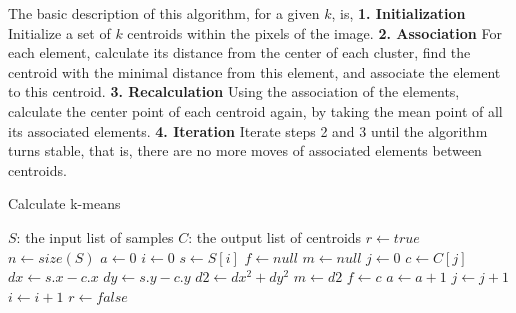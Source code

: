 \documentclass[12pt]{article}
\begin{document}
The basic description of this algorithm, for a given $k$, is, \newline
\textbf{1. Initialization} Initialize a set of $k$ centroids within the pixels of the image. \newline
\textbf{2. Association} For each element, calculate its distance from the center of each cluster, find the centroid with the minimal distance from this element, and associate the element to this centroid. \newline
\textbf{3. Recalculation} Using the association of the elements, calculate the center point of each centroid again, by taking the mean point of all its associated elements. \newline
\textbf{4. Iteration} Iterate steps 2 and 3 until the algorithm turns stable, that is, there are no more moves of associated elements between centroids. \newline

\begin{algorithm}
\caption{Calculate k-means}
\begin{algorithmic} 
\REQUIRE $S$: the input list of samples
\ENSURE $C$: the output list of centroids
\STATE $r \leftarrow true$
\STATE $n \leftarrow size(S)$
\newline
{}
\STATE $a \leftarrow 0$
\newline
\STATE $i \leftarrow 0$
\STATE $s \leftarrow S[i]$
\newline
\STATE $f \leftarrow null$
\STATE $m \leftarrow null$
\newline
\STATE $j \leftarrow 0$
\STATE $c \leftarrow C[j]$
\newline
\STATE $dx \leftarrow s.x - c.x$
\STATE $dy \leftarrow s.y - c.y$
\STATE $d2 \leftarrow dx^2+dy^2$
\newline
{}
\STATE $m \leftarrow d2$
\STATE $f \leftarrow c$
\ENDIF
\newline
{}
\STATE $a \leftarrow a+1$
\ENDIF
\newline
\STATE $j \leftarrow j+1$
\ENDWHILE
\newline
\STATE $i \leftarrow i+1$
\ENDWHILE
\newline
{}
\STATE $r \leftarrow false$
\ENDIF
\newline
\ENDWHILE
\end{algorithmic}
\end{algorithm}

\newpage
\end{document}
